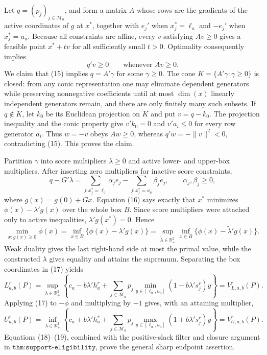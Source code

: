 Let \(q=(p_j)_{j\in\mathcal M_a}\), and form a matrix \(A\) whose rows are the gradients of the active coordinates of \(g\) at \(x^*\), together with \(e_j'\) when \(x_j^*=\ell_a\) and \(-e_j'\) when \(x_j^*=u_a\).  Because all constraints are affine, every \(v\) satisfying \(Av\ge0\) gives a feasible point \(x^*+tv\) for all sufficiently small \(t>0\).  Optimality consequently implies
\[
 q'v\ge0\qquad\text{whenever }Av\ge0.                                        \tag{15}
\]
We claim that (15) implies \(q=A'\gamma\) for some \(\gamma\ge0\).  The cone \(K=\{A'\gamma:\gamma\ge0\}\) is closed: from any conic representation one may eliminate dependent generators while preserving nonnegative coefficients until at most \(\dim(x)\) linearly independent generators remain, and there are only finitely many such subsets.  If \(q\notin K\), let \(k_0\) be its Euclidean projection on \(K\) and put \(v=q-k_0\).  The projection inequality and the conic property give \(v'k_0=0\) and \(v'a_i\le0\) for every row generator \(a_i\).  Thus \(w=-v\) obeys \(Aw\ge0\), whereas \(q'w=-\|v\|^2<0\), contradicting (15).  This proves the claim.

Partition \(\gamma\) into score multipliers \(\lambda\ge0\) and active lower- and upper-box multipliers.  After inserting zero multipliers for inactive score constraints,
\[
 q-G'\lambda
 =\sum_{j:x_j^*=\ell_a}\alpha_je_j
  -\sum_{j:x_j^*=u_a}\beta_je_j,
 \qquad \alpha_j,\beta_j\ge0,                                                 \tag{16}
\]
where \(g(x)=g(0)+Gx\).  Equation (16) says exactly that \(x^*\) minimizes \(\phi(x)-\lambda'g(x)\) over the whole box \(B\).  Since score multipliers were attached only to active inequalities, \(\lambda'g(x^*)=0\).  Hence
\[
 \min_{x:g(x)\ge0}\phi(x)
 =\inf_{x\in B}\{\phi(x)-\lambda'g(x)\}
 =\sup_{\widetilde\lambda\in\mathbb R_+^2}
   \inf_{x\in B}\{\phi(x)-\widetilde\lambda'g(x)\}.                       \tag{17}
\]
Weak duality gives the last right-hand side at most the primal value, while the constructed \(\lambda\) gives equality and attains the supremum.  Separating the box coordinates in (17) yields
\[
 L_{a,b}^r(P)
 =\sup_{\lambda\in\mathbb R_+^2}
 \left\{c_a-b\lambda'h_a^r+
 \sum_{j\in\mathcal M_a}p_j
 \min_{y\in[\ell_a,u_a]}(1-b\lambda's_j^r)y\right\}
 =V_{L,a,b}^r(P).                                                             \tag{18}
\]
Applying (17) to \(-\phi\) and multiplying by \(-1\) gives, with an attaining multiplier,
\[
 U_{a,b}^r(P)
 =\inf_{\lambda\in\mathbb R_+^2}
 \left\{c_a+b\lambda'h_a^r+
 \sum_{j\in\mathcal M_a}p_j
 \max_{y\in[\ell_a,u_a]}(1+b\lambda's_j^r)y\right\}
 =V_{U,a,b}^r(P).                                                             \tag{19}
\]
Equations (18)--(19), combined with the positive-slack filter and closure argument in \(\texttt{thm:support-eligibility}\), prove the general sharp endpoint assertion.

